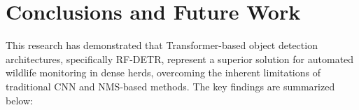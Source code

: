 \section{Conclusions and Future Work}

This research has demonstrated that Transformer-based object detection architectures, specifically RF-DETR, represent a superior solution for automated wildlife monitoring in dense herds, overcoming the inherent limitations of traditional CNN and NMS-based methods. The key findings are summarized below:

